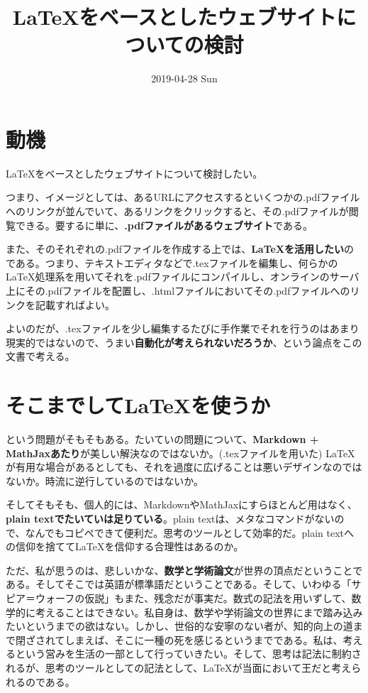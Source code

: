 \documentclass[uplatex,dvipdfmx]{jsarticle} \usepackage{amsmath,amssymb,bm}
\title{\LaTeX をベースとしたウェブサイトについての検討} \author{} \date{2019-04-28 Sun}
\begin{document}
\maketitle


\section*{動機}
\LaTeX をベースとしたウェブサイトについて検討したい。

つまり、イメージとしては、あるURLにアクセスするといくつかの.pdfファイルへのリンクが並んでいて、あるリンクをクリックすると、その.pdfファイルが閲覧できる。要するに単に、{\bf .pdfファイルがあるウェブサイト}である。

また、そのそれぞれの.pdfファイルを作成する上では、{\bf \LaTeX を活用したい}のである。つまり、テキストエディタなどで.texファイルを編集し、何らかの\LaTeX 処理系を用いてそれを.pdfファイルにコンパイルし、オンラインのサーバ上にその.pdfファイルを配置し、.htmlファイルにおいてその.pdfファイルへのリンクを記載すればよい。

よいのだが、.texファイルを少し編集するたびに手作業でそれを行うのはあまり現実的ではないので、うまい{\bf 自動化が考えられないだろうか}、という論点をこの文書で考える。



\section*{そこまでして\LaTeX を使うか}
という問題がそもそもある。たいていの問題について、{\bf Markdown + MathJaxあたり}が美しい解決なのではないか。(.texファイルを用いた) \LaTeX が有用な場合があるとしても、それを過度に広げることは悪いデザインなのではないか。時流に逆行しているのではないか。

そしてそもそも、個人的には、MarkdownやMathJaxにすらほとんど用はなく、{\bf plain textでたいていは足りている}。plain textは、メタなコマンドがないので、なんでもコピペできて便利だ。思考のツールとして効率的だ。plain textへの信仰を捨てて\LaTeX を信仰する合理性はあるのか。

ただ、私が思うのは、悲しいかな、{\bf 数学と学術論文}が世界の頂点だということである。そしてそこでは英語が標準語だということである。そして、いわゆる「サピア＝ウォーフの仮説」もまた、残念だが事実だ。数式の記法を用いずして、数学的に考えることはできない。私自身は、数学や学術論文の世界にまで踏み込みたいというまでの欲はない。しかし、世俗的な安寧のない者が、知的向上の道まで閉ざされてしまえば、そこに一種の死を感じるというまでである。私は、考えるという営みを生活の一部として行っていきたい。そして、思考は記法に制約されるが、思考のツールとしての記法として、\LaTeX が当面において王だと考えられるのである。
\end{document}
